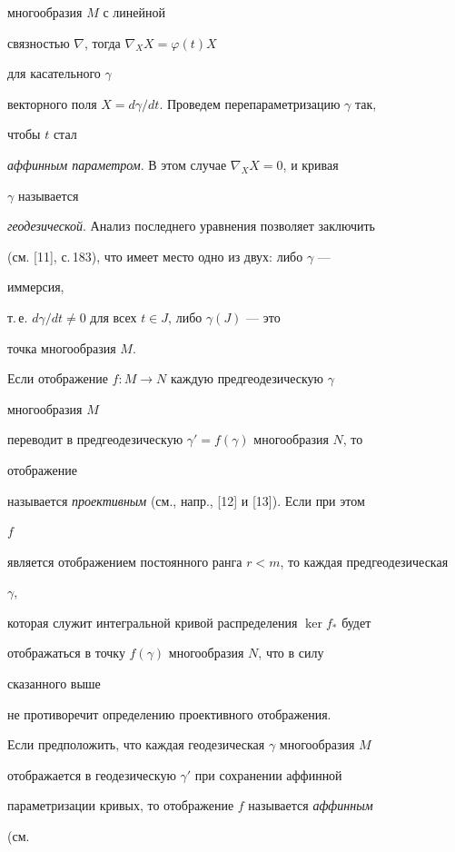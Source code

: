 многообразия $M$ с линейной 


связностью $\nabla$, тогда $\nabla_X X=\varphi(t)X$ 


для касательного $\gamma$ 


векторного поля $X=d\gamma/dt$. Проведем перепараметризацию $\gamma$ так, 


чтобы $t$ стал 


{\it аффинным параметром}. В этом случае $\nabla_X X=0$, и кривая 


$\gamma$ называется 


{\it геодезической}. Анализ последнего уравнения позволяет заключить 


(см. [11], с.\,183), что имеет место одно из двух: либо $\gamma$ --- 


иммерсия, 


т.\,е. $d\gamma/dt\ne 0$ для всех $t\in J$, либо $\gamma(J)$ --- это 


точка многообразия $M$. 


 


Если отображение $f:M\to N$ каждую предгеодезическую $\gamma$ 


многообразия $M$ 


переводит в предгеодезическую $\gamma'=f(\gamma)$ многообразия $N$, то 


отображение 


называется {\it проективным} (см., напр., [12] и [13]). Если при этом 


$f$ 


является отображением постоянного ранга $r<m$, то каждая предгеодезическая 


$\gamma$, 


которая служит интегральной кривой распределения $\ker f_*$ будет 


отображаться в точку $f(\gamma)$ многообразия $N$, что в силу 


сказанного выше 


не противоречит определению проективного отображения. 


 


Если предположить, что каждая геодезическая $\gamma$ многообразия $M$ 


отображается в геодезическую $\gamma'$ при сохранении аффинной 


параметризации кривых, то отображение $f$ называется {\it аффинным} 


(см. 


